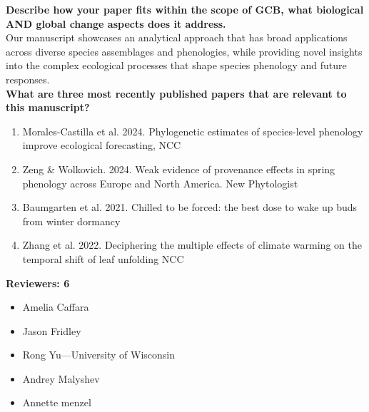 \documentclass{letter}
\begin{document}
\textbf{Describe how your paper fits within the scope of GCB, what biological AND global change aspects does it address.}\\
Our manuscript showcases an analytical approach that has broad applications across diverse species assemblages and phenologies, while providing novel insights into the complex ecological processes that shape species phenology and future responses. \\

\textbf{What are three most recently published papers that are relevant to this manuscript?}\\
\begin{enumerate} %
\item Morales-Castilla et al. 2024. Phylogenetic estimates of species-level phenology improve ecological forecasting, NCC\\
\item Zeng \& Wolkovich. 2024. Weak evidence of provenance effects in spring phenology across Europe and North America. New Phytologist\\
\item Baumgarten et al. 2021. Chilled to be forced: the best dose to wake up buds from winter dormancy\\
\item Zhang et al. 2022. Deciphering the multiple effects of climate warming on the temporal shift of leaf unfolding NCC\\
\end{enumerate}

\textbf{Reviewers: 6}
\begin{itemize}
\item Amelia Caffara
\item Jason Fridley 
\item Rong Yu---University of Wisconsin 
\item Andrey Malyshev
\item Annette menzel
\end{itemize}




\end{document}
